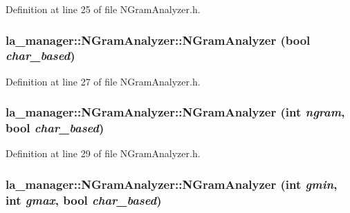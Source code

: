 Definition at line 25 of file NGramAnalyzer.h.\hypertarget{classla__manager_1_1NGramAnalyzer_952815ff68d49c40b0ecf1f5d1617b31}{
\subsubsection[{NGramAnalyzer}]{\setlength{\rightskip}{0pt plus 5cm}la\_\-manager::NGramAnalyzer::NGramAnalyzer (bool {\em char\_\-based})}}
\label{classla__manager_1_1NGramAnalyzer_952815ff68d49c40b0ecf1f5d1617b31}




Definition at line 27 of file NGramAnalyzer.h.\hypertarget{classla__manager_1_1NGramAnalyzer_4f19056e90bd0a8235c78d179ab4e723}{
\subsubsection[{NGramAnalyzer}]{\setlength{\rightskip}{0pt plus 5cm}la\_\-manager::NGramAnalyzer::NGramAnalyzer (int {\em ngram}, \/  bool {\em char\_\-based})}}
\label{classla__manager_1_1NGramAnalyzer_4f19056e90bd0a8235c78d179ab4e723}




Definition at line 29 of file NGramAnalyzer.h.\hypertarget{classla__manager_1_1NGramAnalyzer_6e4a166130e6c68ef77da3639c9cae58}{
\subsubsection[{NGramAnalyzer}]{\setlength{\rightskip}{0pt plus 5cm}la\_\-manager::NGramAnalyzer::NGramAnalyzer (int {\em gmin}, \/  int {\em gmax}, \/  bool {\em char\_\-based})}}
\label{classla__manager_1_1NGramAnalyzer_6e4a166130e6c68ef77da3639c9cae58}




